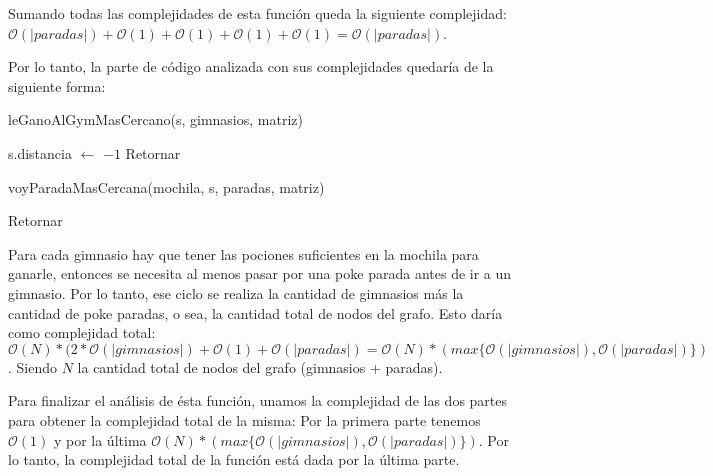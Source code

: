 Sumando todas las complejidades de esta función queda la siguiente complejidad: $\mathcal{O}(|paradas|) + \mathcal{O}(1) + \mathcal{O}(1) + \mathcal{O}(1) + \mathcal{O}(1) = \mathcal{O}(|paradas|)$.

Por lo tanto, la parte de código analizada con sus complejidades quedaría de la siguiente forma:

\begin{algorithm}[H]
\label{}
\begin{algorithmic}[]

 

	 

		\State leGanoAlGymMasCercano(s, gimnasios, matriz) 

	 
		\State s.distancia $\leftarrow$ $-1$ 
		\State Retornar 
	
	\Else

		\State voyParadaMasCercana(mochila, s, paradas, matriz) 

	\EndIf

\EndWhile

\State Retornar 

\medskip
\Statex \underline{}
\end{algorithmic}
\end{algorithm}


Para cada gimnasio hay que tener las pociones suficientes en la mochila para ganarle, entonces se necesita al menos pasar por una poke parada antes de ir a un gimnasio. Por lo tanto, ese ciclo se realiza la cantidad de gimnasios más la cantidad de poke paradas, o sea, la cantidad total de nodos del grafo. Esto daría como complejidad total: $\mathcal{O}(N)* ( 2*\mathcal{O}(|gimnasios|) + \mathcal{O}(1) + \mathcal{O}(|paradas|) = \mathcal{O}(N) * (max\{\mathcal{O}(|gimnasios|), \mathcal{O}(|paradas|)\})$. Siendo $N$ la cantidad total de nodos del grafo (gimnasios + paradas).

Para finalizar el análisis de ésta función, unamos la complejidad de las dos partes para obtener la complejidad total de la misma: Por la primera parte tenemos $\mathcal{O}(1)$ y por la última $\mathcal{O}(N) * (max\{\mathcal{O}(|gimnasios|), \mathcal{O}(|paradas|)\})$. Por lo tanto, la complejidad total de la función está dada por la última parte.

